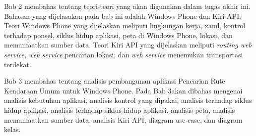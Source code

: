 \hspace{0.5cm} Bab 2 membahas tentang teori-teori yang akan digunakan dalam tugas akhir ini. Bahasan yang dijelasakan pada bab ini adalah Windows Phone dan Kiri API. Teori Windows Phone yang dijelaskan meliputi lingkungan kerja, xaml, kontrol terhadap ponsel, siklus hidup aplikasi, peta di Windows Phone, lokasi, dan memanfaatkan sumber data. Teori Kiri API yang dijelaskan meliputi \textit{routing web service}, \textit{web service} pencarian lokasi, dan \textit{web service} menemukan transportasi terdekat. 

\hspace{0.5cm} Bab 3 membahas tentang analisis pembangunan aplikasi Pencarian Rute Kendaraan Umum untuk Windows Phone. Pada Bab 3akan dibahas mengenai analisis kebutuhan aplikasi, analisis kontrol yang dipakai, analisis terhadap siklus hidup aplikasi, analisis terhadap siklus hidup aplikasi, analisis peta, analisis memanfaatkan sumber data, analisis Kiri API, diagram use case, dan diagram kelas.